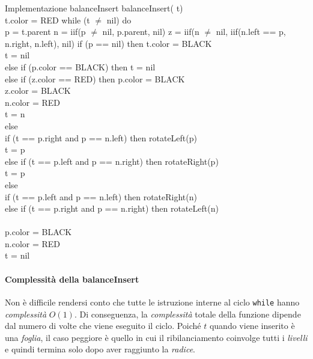 \begin{minicode}{Implementazione balanceInsert}
\ind balanceInsert( t)\\
    t.color = RED\hfill{}
    \indf while (t $\neq$ nil) do\\
         p = t.parent\hfill{}
         n = iif(p $\neq$ nil, p.parent, nil)\hfill{}
         z = iif(n $\neq$ nil, iif(n.left == p, n.right, n.left), nil)\hfill{}
        \indff if (p == nil) then\hfill{}
            t.color = BLACK\\
            t = nil\\
        \indff else if (p.color == BLACK) then\hfill{}
            t = nil\\
        \indff else if (z.color == RED) then\hfill{}
            p.color = BLACK\\
            z.color = BLACK\\
            n.color = RED\\
            t = n\\
        \indff else\\
            \indfff if (t == p.right and p == n.left) then\hfill{}
                rotateLeft(p)\\
                t = p\\
            \indfff else if (t == p.left and p == n.right) then\hfill{}
                rotateRight(p)\\
                t = p\\
            \indfff else\\
                \indffff if (t == p.left and p == n.left) then\hfill{}
                    rotateRight(n)\\
                \indffff else if (t == p.right and p == n.right) then\hfill{}
                    rotateLeft(n)\\
            \indfff\\
                p.color = BLACK\\
                n.color = RED\\
                t = nil
\end{minicode}

\paragraph{Complessità della balanceInsert}
Non è difficile rendersi conto che tutte le istruzione interne al ciclo
\texttt{while} hanno \emph{complessità} $O(1)$. Di conseguenza, la
\emph{complessità} totale della funzione dipende dal numero di volte che viene
eseguito il ciclo. Poiché $t$ quando viene inserito è una \emph{foglia},\footnotemark
il caso peggiore è quello in cui il ribilanciamento coinvolge tutti i \emph{livelli}
e quindi termina solo dopo aver raggiunto la \emph{radice}.

